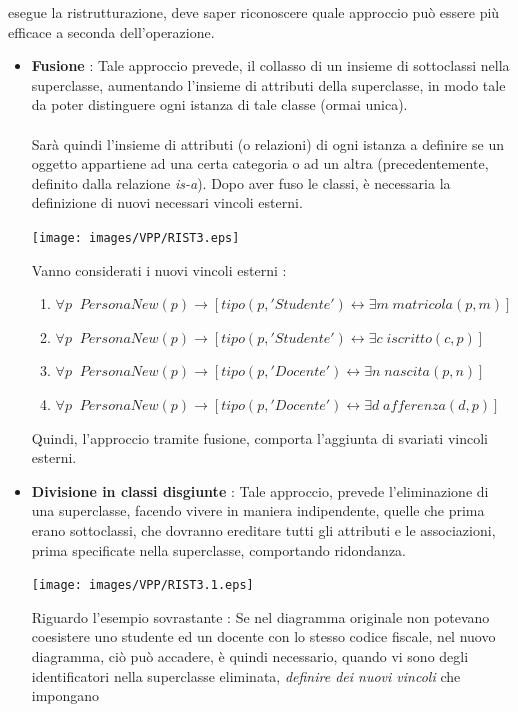 \documentclass[12pt, letterpaper]{article}
\newcommand{\acc}{\\\hphantom{}\\}
\begin{document}
esegue la ristrutturazione, deve saper riconoscere quale approccio può essere più efficace a seconda dell'operazione.\begin{itemize}
    \item \textbf{Fusione} : Tale approccio prevede, il collasso di un insieme di sottoclassi nella superclasse,
    aumentando l'insieme di attributi della superclasse, in modo tale da poter distinguere ogni istanza di tale 
    classe (ormai unica).\acc Sarà quindi l'insieme di attributi (o relazioni) di ogni istanza a definire se un oggetto 
    appartiene ad una certa categoria o ad un altra (precedentemente, definito dalla relazione \textit{is-a}). Dopo aver 
    fuso le classi, è necessaria la definizione di nuovi necessari vincoli esterni.\begin{center}
        \texttt{[image: images/VPP/RIST3.eps]}
    \end{center}
    Vanno considerati i nuovi vincoli esterni : \begin{enumerate}
        \item $\forall p\;\;PersonaNew(p)\rightarrow[tipo(p, 'Studente') \leftrightarrow \exists m\;  matricola(p, m)]$
        \item $\forall p\;\; PersonaNew(p)\rightarrow [tipo(p, 'Studente') \leftrightarrow \exists c\; iscritto(c, p)]$
        \item $\forall p\;\; PersonaNew(p) \rightarrow [tipo(p, 'Docente') \leftrightarrow \exists n\; nascita(p, n)]$
        \item $\forall p\;\; PersonaNew(p) \rightarrow [tipo(p, 'Docente') \leftrightarrow \exists d \;afferenza(d, p)]$
    \end{enumerate}
    Quindi, l'approccio tramite fusione, comporta l'aggiunta di svariati vincoli esterni.
    \item \textbf{Divisione in classi disgiunte} : Tale approccio, prevede l'eliminazione di una superclasse, 
    facendo vivere in maniera indipendente, quelle che prima erano sottoclassi, che dovranno ereditare tutti 
    gli attributi e le associazioni, prima specificate nella superclasse, comportando ridondanza.\begin{center}
        \texttt{[image: images/VPP/RIST3.1.eps]}
    \end{center}
    Riguardo l'esempio sovrastante : Se nel diagramma originale non potevano coesistere uno studente ed un 
    docente con lo stesso codice fiscale, nel nuovo diagramma, ciò può accadere, è quindi necessario, quando 
    vi sono degli identificatori nella superclasse eliminata, \textit{definire dei nuovi vincoli} che impongano 

\end{itemize}
\end{document}
